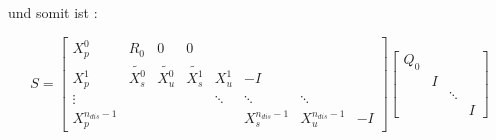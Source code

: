 und somit ist :

$$S=\left[\begin{array}{cccccccc}
X_p^0 & R_0 & 0 & 0 &  &  &  &  \\ 
X_p^1 & \tilde{X_s^0} & \tilde{X_u^0} & \tilde{X_s^1} & X_u ^1  & -I &  &  \\ 
\vdots &  &  &  & \ddots & \ddots & \ddots &  \\ 
X_p^{n_{dis}-1} &  &  &  &  & X_s^{n_{dis}-1} & X_u^{n_{dis}-1} & -I
\end{array}  \right] \left[\begin{array}{cccc}
Q_0 &  &  &  \\ 
 & I &  &  \\ 
 &  & \ddots &  \\ 
 &  &  & I
\end{array}  \right]$$